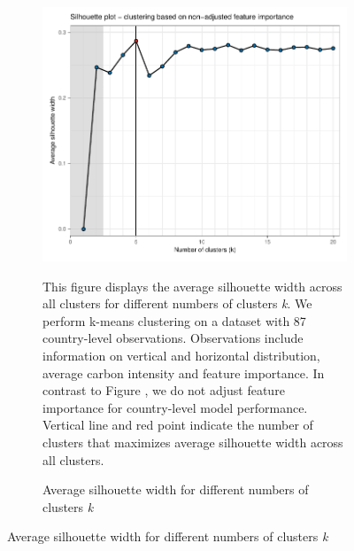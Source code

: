 \begin{figure}[ht!]\ContinuedFloat
   \centering
   \begin{subfigure}[b]{\textwidth}
   \centering
   \caption{Average silhouette width for different numbers of clusters \textit{k}} \label{fig:G1_silhouette}
   \includegraphics{Figures_Appendix/Figure_Silhouette_1}
   \begin{subcaption2}
     This figure displays the average silhouette width across all clusters for different numbers of clusters \textit{k}. We perform k-means clustering on a dataset with 87 country-level observations. Observations include information on vertical and horizontal distribution, average carbon intensity and feature importance. In contrast to Figure , we do not adjust feature importance for country-level model performance. Vertical line and red point indicate the number of clusters that maximizes average silhouette width across all clusters.
   \end{subcaption2}
   \end{subfigure}
 \end{figure}

 \clearpage

